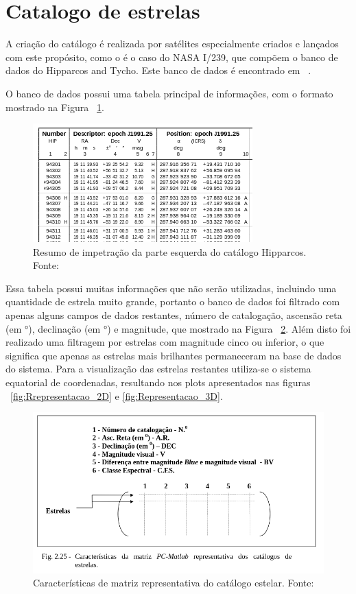 \section{Catalogo de estrelas}

A criação do catálogo é realizada por satélites especialmente criados e lançados com este propósito, como o é o caso do NASA I/239, que compõem o banco de dados do Hipparcos and Tycho. Este banco de dados é encontrado em ~\cite[]{ESA}.

O banco de dados possui uma tabela principal de informações, com o formato mostrado na Figura ~\ref{fig:Resumo_impetracao_parte_esquerda_Hipparcos}.

\begin{figure}[H]
	\centering
	\includegraphics[width=.7\columnwidth]{images/Resumo_impetracao_parte_esquerda_Hipparcos.png}
	\caption{Resumo de impetração da parte esquerda do catálogo Hipparcos. Fonte: ~\cite[]{ESA}}
	\label{fig:Resumo_impetracao_parte_esquerda_Hipparcos}
\end{figure}

Essa tabela possui muitas informações que não serão utilizadas, incluindo uma quantidade de estrela muito grande, 
portanto o banco de dados foi filtrado com apenas alguns campos de dados restantes, número de catalogação, ascensão reta (em °), 
declinação (em °) e magnitude, que mostrado na Figura ~\ref{fig:Caracteristicas_matriz}. 
Além disto foi realizado uma filtragem por estrelas com magnitude cinco ou inferior, 
o que significa que apenas as estrelas mais brilhantes permaneceram na base de dados do sistema. 
Para a visualização das estrelas restantes utiliza-se o sistema equatorial de coordenadas, resultando nos plots apresentados nas figuras ~\ref{fig:Rrepresentacao_2D} e \ref{fig:Representacao_3D}.

\begin{figure}[H]
	\centering
	\includegraphics[width=.7\columnwidth, trim={0 60 0 0}, clip]{images/Caracteristicas_matriz.png}
	\caption{Características de matriz representativa do catálogo estelar. Fonte: ~\cite[]{Carvalho}}
	\label{fig:Caracteristicas_matriz}
\end{figure}

